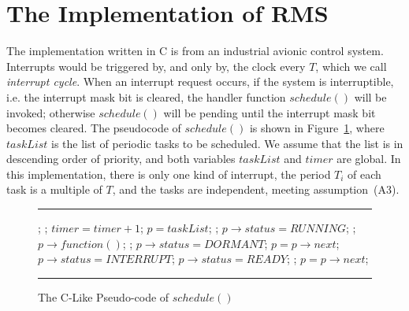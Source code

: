 \documentclass[10pt,journal]{IEEEtran}
\begin{document}
{\section{The Implementation of RMS}
\label{s:imp}
The implementation written in C is from an industrial avionic control
system.  Interrupts would be triggered by, and only by, the clock
every $T$, which we call \emph{interrupt cycle}. When an interrupt
request occurs, if the system is interruptible, i.e. the interrupt
mask bit is cleared, the handler function $schedule()$ will be
invoked; otherwise $schedule()$ will be pending until the interrupt
mask bit becomes cleared.  The pseudocode of $schedule()$ is shown in
Figure~\ref{a:schedule}, where $taskList$ is the list of periodic
tasks to be scheduled. We assume that the list is in descending order
of priority, and both variables $taskList$ and $timer$ are global. In
this implementation, there is only one kind of interrupt, the period
$T_i$ of each task is a multiple of $T$, and the tasks are
independent, meeting assumption~(A3).

\begin{figure}[!t]
\hrule\vspace{1mm}
  \begin{algorithmic}[1]\small
{}
  \State {};  \label{l:1stline}
  \State {}; \label{l:updatestatus}
  \State $timer = timer + 1$; \label{l:timer} \label{l:inc}
  \State $p = taskList$;
   \label{l:startrun1st}
      \State \Return; \label{l:return}
      \State $p\rightarrow status = \textit{RUNNING}$;
      \State {};  \label{l:endrun1st}
      \State $p\rightarrow function()$;  \label{l:function}
      \State {};
      \State $p\rightarrow status = \textit{DORMANT}$;
    \EndIf
    \State $p = p\rightarrow next$;
  \EndWhile
\EndFunction
{}
     \label{l:startupdate}
      \State $p\rightarrow status = \textit{INTERRUPT}$;
    \EndIf
     
        
        \State $p\rightarrow status = \textit{READY}$;
      \Else {}
  \State {}; 
      \EndIf
    \EndIf \label{l:endupdate}
    \State $p = p\rightarrow next$;
  \EndWhile
\EndFunction
  \end{algorithmic}
\hrule
  \caption{The C-Like Pseudo-code of $schedule()$}
  \label{a:schedule}
\end{figure}

}
\end{document}
